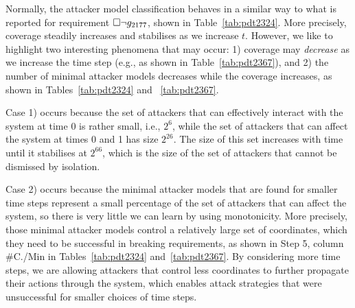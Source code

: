 Normally, the attacker model classification behaves in a similar way to what is reported for requirement $ {{\square}} \lnot g_{2177}$, shown in Table~\ref{tab:pdt2324}. More precisely, coverage steadily increases and stabilises as we increase $t$. However, we like to highlight two interesting phenomena that may occur: 1) coverage {may} \emph{decrease} as we increase the time step (e.g., as shown in Table~\ref{tab:pdt2367}), and 2) the number of minimal attacker models decreases while the coverage increases, as shown in Tables~\ref{tab:pdt2324} and ~\ref{tab:pdt2367}. 
{\color{red}

Case 1) occurs because the set of attackers that can effectively interact with the system at time 0 is rather small, i.e., $2^6$, while the set of attackers that can affect the system at times 0 and 1 has size $2^{26}$. The size of this set increases with time until it stabilises at $2^{66}$, which is the size of the set of attackers that cannot be dismissed by isolation. 

Case 2) occurs because the minimal attacker models that are found for smaller time steps represent a small percentage of the set of attackers that can affect the system, so there is very little we can learn by using monotonicity. More precisely, those minimal attacker models control a relatively large set of coordinates, which they need to be successful in breaking requirements, as shown in Step 5, column \#C./Min in Tables~\ref{tab:pdt2324} and~\ref{tab:pdt2367}. By considering more time steps, we are allowing attackers that control less coordinates to further propagate their actions through the system, which enables attack strategies that were unsuccessful for smaller choices of time steps.

}
